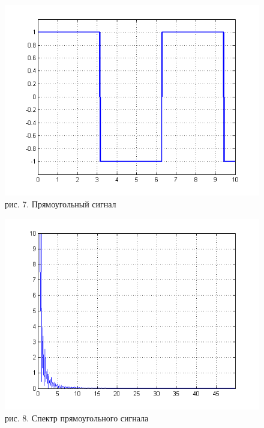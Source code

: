 \documentclass[10pt,a4paper]{report}
\begin{document}
\begin{figure}
\begin{center}
\includegraphics[width=150mm, scale = 0.9]{5_3.png}\newline
рис. 7. Прямоугольный сигнал\newline
\end{center}
\end{figure}
\begin{figure}
\begin{center}
\includegraphics[width=150mm, scale = 0.9]{5_4.png}\newline
рис. 8. Спектр прямоугольного сигнала\newline
\end{center}
\end{figure}
\end{document}
